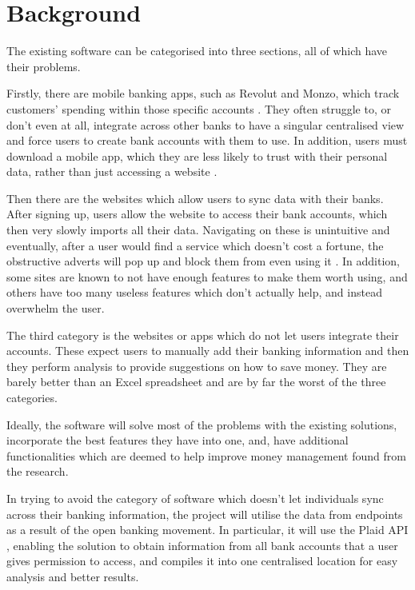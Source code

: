 \section{Background}
The existing software can be categorised into three sections, all of which have their problems. 

Firstly, there are mobile banking apps, such as Revolut and Monzo, which track customers' spending within those specific accounts \cite{RevolutBudgetting} \cite{MonzoBudgetting}. They often struggle to, or don't even at all, integrate across other banks to have a singular centralised view and force users to create bank accounts with them to use. In addition, users must download a mobile app, which they are less likely to trust with their personal data, rather than just accessing a website \cite{AppVsWebsite}.

Then there are the websites which allow users to sync data with their banks. After signing up, users allow the website to access their bank accounts, which then very slowly imports all their data. Navigating on these is unintuitive and eventually, after a user would find a service which doesn't cost a fortune, the obstructive adverts will pop up and block them from even using it \cite{PersonalFinanceAppsComparison}. In addition, some sites are known to not have enough features to make them worth using, and others have too many useless features which don't actually help, and instead overwhelm the user.

The third category is the websites or apps which do not let users integrate their accounts. These expect users to manually add their banking information and then they perform analysis to provide suggestions on how to save money. They are barely better than an Excel spreadsheet and are by far the worst of the three categories.

Ideally, the software will solve most of the problems with the existing solutions, incorporate the best features they have into one, and, have additional functionalities which are deemed to help improve money management found from the research.

In trying to avoid the category of software which doesn't let individuals sync across their banking information, the project will utilise the data from endpoints as a result of the open banking movement. In particular, it will use the Plaid API \cite{Plaid}, enabling the solution to obtain information from all bank accounts that a user gives permission to access, and compiles it into one centralised location for easy analysis and better results.                                                                           